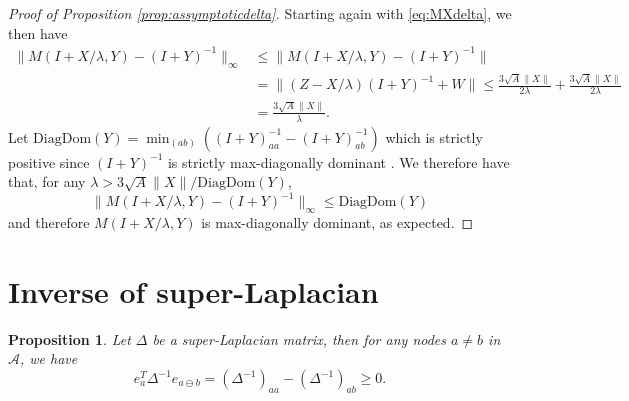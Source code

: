 \documentclass{article}
\newtheorem{proposition}{Proposition}
\newcommand{\cA}{\mathcal A}
\newcommand{\ab}{a\ominus{} b}
\begin{document}
\begin{proof}[Proof of Proposition \ref{prop:assymptoticdelta}]
Starting again with \eqref{eq:MXdelta}, we then have 
\begin{align}
    \| M(I + X /\lambda,Y) - (I + Y)^{-1} \|_\infty
    &\leq     \| M(I + X /\lambda,Y) - (I + Y)^{-1} \| \\
   & = \| (Z - X / \lambda) (I +Y)^{-1} + W \|
    \leq \frac{3 \sqrt{A} \| X\|}{2 \lambda} + \frac{3\sqrt{A}  \| X\|}{2 \lambda} \\
    &= \frac{3\sqrt{A}  \| X\|}{\lambda}.
\end{align}
Let $\mathrm{DiagDom} (Y) = \min_{(ab)} \left((I + Y)^{-1}_{aa} - (I + Y)^{-1}_{ab}\right)$ which is strictly positive since $(I + Y)^{-1}$ is strictly max-diagonally dominant 
 \cite{DBLP:conf/aaai/FageotFHV24}. We therefore have that, for any $\lambda > 3\sqrt{A}\|X\| /\mathrm{DiagDom} (Y)$, $$\| M(I + X /\lambda,Y) - (I + Y)^{-1} \|_\infty \leq \mathrm{DiagDom} (Y) $$ and therefore $M(I + X /\lambda,Y)$ is max-diagonally dominant, as expected.
\end{proof}


\section{Inverse of super-Laplacian}
\label{app:prooflemmasuperlaplacian}   

\begin{proposition}
Let $\Delta$ be a super-Laplacian matrix, then for any nodes $a \neq b$ in $\cA$, we have
\[
e_a^T \Delta^{-1} e_{\ab} = (\Delta^{-1})_{aa} - (\Delta^{-1})_{ab} \geq 0.
\]
\end{proposition}
\end{document}
